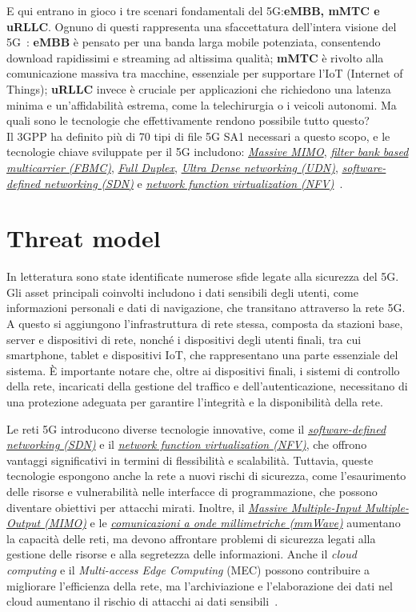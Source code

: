 \documentclass[english]{article}
\begin{document}
E qui entrano in gioco i tre scenari fondamentali del 5G:\@ \textbf{eMBB, mMTC 
e uRLLC}. Ognuno di questi rappresenta una sfaccettatura dell'intera visione
del 5G~\cite{Ji2018Overview}: \textbf{eMBB} è pensato per una banda larga
mobile potenziata, consentendo download rapidissimi e streaming ad altissima
qualità; \textbf{mMTC} è rivolto alla comunicazione massiva tra macchine,
essenziale per supportare l’IoT (Internet of Things); \textbf{uRLLC} invece è
cruciale per applicazioni che richiedono una latenza minima e un'affidabilità
estrema, come la telechirurgia o i veicoli autonomi. Ma quali sono le
tecnologie che effettivamente rendono possibile tutto questo?
\\
\sloppy
Il 3GPP ha definito più di 70 tipi di file 5G SA1 necessari a questo scopo, e
le tecnologie chiave sviluppate per il 5G includono:
\textit{\hyperlink{MIMO}{Massive MIMO}},
\textit{\hyperlink{FBMC}{filter bank based multicarrier (FBMC)}},
\textit{\hyperlink{FullDuplex}{Full Duplex}},
\textit{\hyperlink{UDN}{Ultra Dense networking (UDN)}},
\textit{\hyperlink{SDN}{software-defined networking (SDN)}} 
e
\textit{\hyperlink{NFV}{network function virtualization (NFV)}}~\cite{Ji2018Overview}.
\section{Threat model}
In letteratura sono state identificate numerose sfide legate alla sicurezza del
5G. Gli asset principali coinvolti includono i dati sensibili degli utenti,
come informazioni personali e dati di navigazione, che transitano attraverso la
rete 5G. A questo si aggiungono l'infrastruttura di rete stessa, composta da
stazioni base, server e dispositivi di rete, nonché i dispositivi degli utenti
finali, tra cui smartphone, tablet e dispositivi IoT, che rappresentano una
parte essenziale del sistema. È importante notare che, oltre ai dispositivi
finali, i sistemi di controllo della rete, incaricati della gestione del
traffico e dell'autenticazione, necessitano di una protezione adeguata per
garantire l'integrità e la disponibilità della rete.

Le reti 5G introducono diverse tecnologie innovative, come il
\textit{\hyperlink{SDN}{software-defined networking (SDN)}} e il
\textit{\hyperlink{NFV}{network function virtualization (NFV)}}, che offrono
vantaggi significativi in termini di flessibilità e scalabilità. Tuttavia,
queste tecnologie espongono anche la rete a nuovi rischi di sicurezza, come
l'esaurimento delle risorse e vulnerabilità nelle interfacce di programmazione,
che possono diventare obiettivi per attacchi mirati. Inoltre, il
\textit{\hyperlink{MIMO}{Massive Multiple-Input Multiple-Output (MIMO)}} e le
\textit{\hyperlink{mmWave}{comunicazioni a onde millimetriche (mmWave)}}
aumentano la capacità delle reti, ma devono affrontare problemi di sicurezza
legati alla gestione delle risorse e alla segretezza delle informazioni. Anche
il \textit{cloud computing} e il \textit{Multi-access Edge Computing} (MEC)
possono contribuire a migliorare l'efficienza della rete, ma l'archiviazione e
l'elaborazione dei dati nel cloud aumentano il rischio di attacchi ai dati
sensibili~\cite{Ahmad2019Security}.
\end{document}
